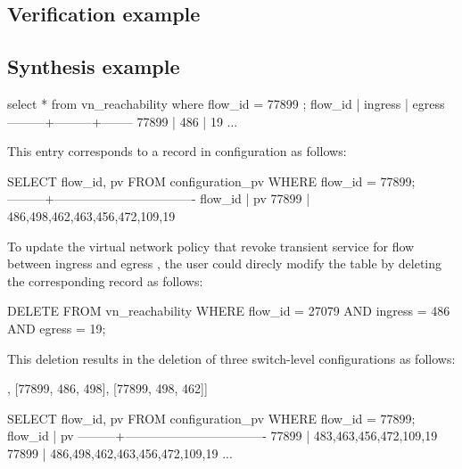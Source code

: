% 


\subsection{Verification example}

\subsection{Synthesis example}

\begin{sql}
select * from vn_reachability where flow_id = 77899 ;
 flow_id | ingress | egress 
---------+---------+--------
   77899 |     486 |     19  
   ...
\end{sql}

This entry corresponds to a record in configuration as follows:
\begin{sql}
SELECT flow_id, pv FROM configuration_pv WHERE flow_id = 77899;
---------+----------------------------------
 flow_id |                pv                
   77899 | {486,498,462,463,456,472,109,19}
\end{sql}

To update the virtual network policy that revoke transient service for
flow  between ingress  and egress , the user
could direcly modify the  table by deleting the
corresponding record as follows:
\begin{sql}
DELETE FROM vn_reachability WHERE 
        flow_id = 27079 AND ingress = 486 AND egress = 19;  
\end{sql}

This deletion results in the deletion of three switch-level
configurations as follows:
\begin{sql}
[[77899, 462, 463], [77899, 486, 498], [77899, 498, 462]]  
\end{sql}

\begin{sql}
SELECT flow_id, pv FROM configuration_pv WHERE flow_id = 77899;
 flow_id |                pv                
---------+----------------------------------
   77899 | {483,463,456,472,109,19}
   77899 | {486,498,462,463,456,472,109,19}
   ...
\end{sql}




